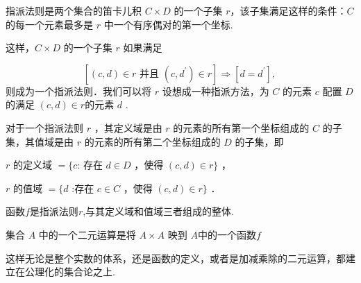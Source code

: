 \begin{definition}指派法则是两个集合的笛卡儿积 $C \times D$ 的一个子集 $r$，该子集满足这样的条件：$C$ 的每一个元素最多是 $r$ 中一个有序偶对的第一个坐标.
	
	这样，$C \times D$ 的一个子集 $r$ 如果满足
	
	$$
	\left[(c, d) \in r \text { 并且 }\left(c, d^{\prime}\right) \in r\right] \Longrightarrow\left[d=d^{\prime}\right] \text {, }
	$$
	则成为一个指派法则．我们可以将 $r$ 设想成一种指派方法，为 $C$ 的元素 $c$ 配置 $D$ 的满足 $(c, d) \in r$的元素 $d$ .
	
	对于一个指派法则 $r$ ，其定义域是由 $r$ 的元素的所有第一个坐标组成的 $C$ 的子集，其值域是由 $r$ 的元素的所有第二个坐标组成的 $D$ 的子集，即
	
	$r$ 的定义域 $=\{c $: 存在 $d \in D$ ，使得 $(c, d) \in r\}$ ，
	
	$r$ 的值域 $=\{d $ :存在 $c \in C$ ，使得 $(c, d) \in r\}$ ．
	
	函数$f$是指派法则$r$,与其定义域和值域三者组成的整体.
\end{definition}
\begin{definition}
	集合  $A $ 中的一个二元运算是将  $A \times A$ 映到  $A  $中的一个函数$  f $
\end{definition}
这样无论是整个实数的体系，还是函数的定义，或者是加减乘除的二元运算，都建立在公理化的集合论之上.
